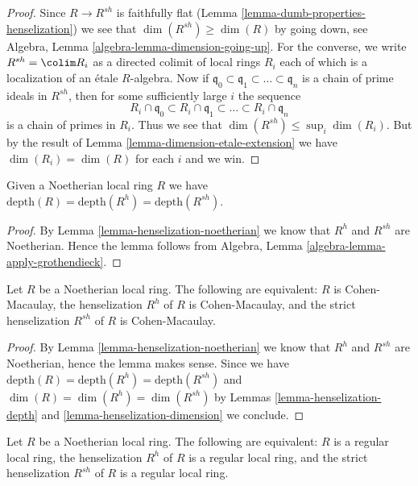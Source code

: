 \begin{proof}
Since $R \to R^{sh}$ is faithfully flat
(Lemma \ref{lemma-dumb-properties-henselization})
we see that $\dim(R^{sh}) \geq \dim(R)$ by going down, see
Algebra, Lemma \ref{algebra-lemma-dimension-going-up}.
For the converse, we write $R^{sh} = \colim R_i$ as
a directed colimit of local rings $R_i$ each of which is a
localization of an \'etale $R$-algebra. Now if
$\mathfrak q_0 \subset \mathfrak q_1 \subset \ldots \subset \mathfrak q_n$
is a chain of prime ideals in $R^{sh}$, then for some sufficiently
large $i$ the sequence
$$
R_i \cap \mathfrak q_0 \subset
R_i \cap \mathfrak q_1 \subset \ldots \subset
R_i \cap \mathfrak q_n
$$
is a chain of primes in $R_i$. Thus we see that
$\dim(R^{sh}) \leq \sup_i \dim(R_i)$.
But by the result of
Lemma \ref{lemma-dimension-etale-extension}
we have $\dim(R_i) = \dim(R)$ for each $i$ and we win.
\end{proof}

\begin{lemma}
\label{lemma-henselization-depth}
Given a Noetherian local ring $R$ we have
$\text{depth}(R) = \text{depth}(R^h) = \text{depth}(R^{sh})$.
\end{lemma}

\begin{proof}
By
Lemma \ref{lemma-henselization-noetherian}
we know that $R^h$ and $R^{sh}$ are Noetherian. Hence the lemma follows
from
Algebra, Lemma \ref{algebra-lemma-apply-grothendieck}.
\end{proof}

\begin{lemma}
\label{lemma-henselization-CM}
Let $R$ be a Noetherian local ring. The following are equivalent:
$R$ is Cohen-Macaulay, the henselization $R^h$ of $R$ is Cohen-Macaulay,
and the strict henselization $R^{sh}$ of $R$ is Cohen-Macaulay.
\end{lemma}

\begin{proof}
By
Lemma \ref{lemma-henselization-noetherian}
we know that $R^h$ and $R^{sh}$ are Noetherian, hence the lemma makes
sense. Since we have
$\text{depth}(R) = \text{depth}(R^h) = \text{depth}(R^{sh})$
and
$\dim(R) = \dim(R^h) = \dim(R^{sh})$
by
Lemmas \ref{lemma-henselization-depth} and
\ref{lemma-henselization-dimension}
we conclude.
\end{proof}

\begin{lemma}
\label{lemma-henselization-regular}
Let $R$ be a Noetherian local ring. The following are equivalent:
$R$ is a regular local ring, the henselization $R^h$ of $R$ is a regular
local ring, and the strict henselization $R^{sh}$ of $R$ is a regular
local ring.
\end{lemma}

